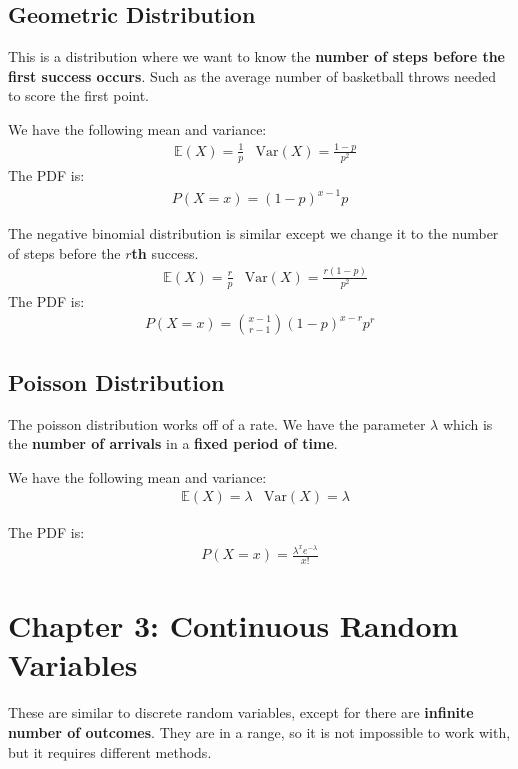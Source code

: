 \documentclass[12pt,letterpaper]{article} \usepackage{amsmath} \usepackage{graphicx} \usepackage[margin=1in]{geometry} \usepackage{longtable}  \usepackage{amssymb}
\begin{document}
	\subsection{Geometric Distribution}
	This is a distribution where we want to know the\textbf{ number of steps before the first success occurs}. Such as the average number of basketball throws needed to score the first point. 
	
	We have the following mean and variance:
	\begin{align*}
		&\mathbb E(X) = \frac{1}{p} &\text{Var}(X) = \frac{1-p}{p^2}
	\end{align*}
	The PDF is:
	\begin{align*}
		P(X=x)=(1-p)^{x-1}p
	\end{align*}

	The negative binomial distribution is similar except we change it to the number of steps before the \textbf{$r$th} success. 
	\begin{align*}
		&\mathbb E(X) = \frac{r}{p} &\text{Var}(X) = \frac{r(1-p) }{p^2}
	\end{align*}
	The PDF is:
	\begin{align*}
		P(X=x)= \binom{x-1}{r-1} (1-p)^{x-r}p^r
	\end{align*}

	\subsection{Poisson Distribution}
	The poisson distribution works off of a rate. We have the parameter $\lambda$ which is the \textbf{number of arrivals} in a \textbf{fixed period of time}. 
	
	We have the following mean and variance:
	\begin{align*}
		&\mathbb E(X) =\lambda &\text{Var}(X) = \lambda
	\end{align*}

	The PDF is:
	\begin{align*}
		P(X=x) = \frac{\lambda^xe^{-\lambda}}{x!}
	\end{align*}
	
	\section{Chapter 3: Continuous Random Variables}
	These are similar to discrete random variables, except for there are\textbf{ infinite number of outcomes}. They are in a range, so it is not impossible to work with, but it requires different methods.
	
\end{document}
